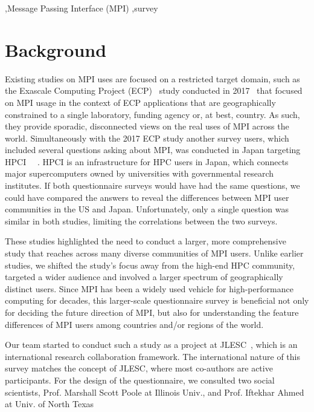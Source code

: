 \documentclass[preprint,5p,times]{elsarticle}
\begin{document}
\begin{keyword}
   \sep Message Passing Interface (MPI) \sep survey
\end{keyword}

\maketitle

\section{Background}\label{sec:background}

Existing studies on MPI uses are focused on a restricted target
domain, such as the Exascale Computing Project (ECP)~\cite{ECP} study
conducted in 2017~\cite{ECP-survey} that focused
on MPI usage in the
context of ECP applications that are geographically
constrained to a single laboratory, funding agency or, at best,
country. As such, they provide sporadic, disconnected views on the real
uses of MPI across the world.
%
Simultaneously with
the 2017 ECP study another survey users, which included several questions asking about
MPI, was conducted in Japan targeting
HPCI~\cite{HPCI} ~\cite{hpci-user-survey}.  HPCI is an infrastructure for HPC users
in Japan, which connects major supercomputers owned by universities with
governmental research institutes. If both questionnaire surveys would
have had the same questions, we could have compared the answers to reveal
the differences between MPI user
communities in the US and Japan. Unfortunately, only a single question was similar in both
studies, limiting the correlations between the two surveys.

These studies highlighted the need to conduct a larger, more comprehensive
study that reaches across many diverse communities of MPI users.
Unlike earlier studies, we shifted the study's focus away from
the high-end HPC community, targeted a wider audience and involved a larger
spectrum of geographically distinct users. Since MPI has been a widely used
vehicle for high-performance computing for decades, this larger-scale
questionnaire survey is beneficial not only for deciding the future
direction of MPI, but also for understanding the feature differences of MPI
users among countries and/or regions of the world.

Our team started to conduct such a study as a project at
JLESC~\cite{JLESC}, which is an international research collaboration
framework. The international nature of this survey matches the concept
of JLESC, where most co-authors are active participants.
For the design of the questionnaire,
we consulted two social scientists, Prof. Marshall Scott Poole at
Illinois Univ., and Prof. Iftekhar Ahmed at Univ. of North Texas
\end{document}
